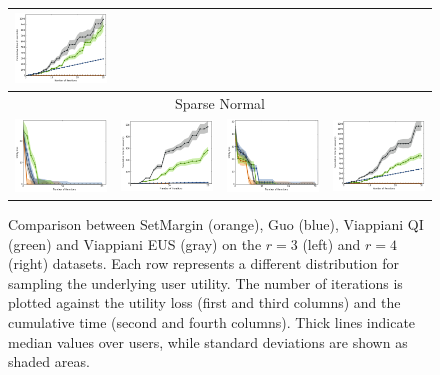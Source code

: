 \documentclass{article}
\renewcommand\[{\begin{equation}}
\renewcommand\]{\end{equation}}
\begin{document}
\begin{figure}[h!]
{\begin{tabular}{cccc}
        \includegraphics[width=10em]{figures/synthetic_vs_others_4_uniform_sparse_per_iter_time}
        \\
        \hline
        \multicolumn{4}{c}{{\sc Sparse Normal}}
        \\
        \includegraphics[width=10em]{figures/synthetic_vs_others_3_normal_sparse_per_iter_loss} &
        \includegraphics[width=10em]{figures/synthetic_vs_others_3_normal_sparse_per_iter_time} &
        \includegraphics[width=10em]{figures/synthetic_vs_others_4_normal_sparse_per_iter_loss} &
        \includegraphics[width=10em]{figures/synthetic_vs_others_4_normal_sparse_per_iter_time}
        \\
        \hline
    \end{tabular}
    }
    \caption{\label{fig:comparison} Comparison between {\sc SetMargin}
      (orange), Guo (blue), Viappiani QI (green) and Viappiani EUS
      (gray) on the $r=3$ (left) and $r=4$ (right) datasets. Each row
      represents a different distribution for sampling the underlying
      user utility.  The number of iterations is plotted against the
      utility loss (first and third columns) and the cumulative time
      (second and fourth columns).  Thick lines indicate median values
      over users, while standard deviations are shown as shaded
      areas.}
\end{figure}
\end{document}
